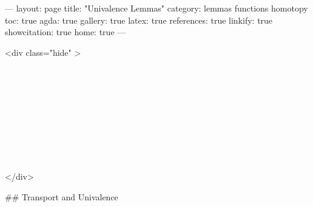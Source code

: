 ---
layout: page
title: "Univalence Lemmas"
category: lemmas functions homotopy
toc: true
agda: true
gallery: true
latex: true
references: true
linkify: true
showcitation: true
home: true
---

<div class="hide" >
\begin{code}%
\>[0]\AgdaSymbol{\{-\#}\AgdaSpace{}%
\AgdaSpace{}%
\AgdaSpace{}%
\AgdaSymbol{\#-\}}\<%
\\
\>[0]\AgdaSpace{}%
\AgdaSpace{}%
\<%
\\
\>[0]\AgdaSpace{}%
\AgdaSpace{}%
\<%
\\
%
\\[\AgdaEmptyExtraSkip]%
\>[0]\AgdaSpace{}%
\AgdaSpace{}%
\<%
\\
\>[0]\AgdaSpace{}%
\AgdaSpace{}%
\<%
\\
\>[0]\AgdaSpace{}%
\AgdaSpace{}%
\<%
\\
%
\\[\AgdaEmptyExtraSkip]%
\>[0]\AgdaSpace{}%
\AgdaSpace{}%
\<%
\end{code}
</div>

## Transport and Univalence

